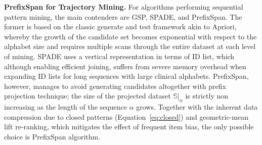 \textbf{PrefixSpan for Trajectory Mining.} For algorithms performing sequential pattern mining, the main contenders are GSP, SPADE, and PrefixSpan. The former is based on the classic generate and test framework akin to Apriori, whereby the growth of the candidate set becomes exponential with respect to the alphabet size and requires multiple scans through the entire dataset at each level of mining. SPADE uses a vertical representation in terms of ID list, which although enabling efficient joining, suffers from severe memory overhead when expanding ID lists for long sequences with large clinical alphabets. PrefixSpan, however, manages to avoid generating candidates altogether with prefix projection technique; the size of the projected dataset $\mathbb{S}|_\alpha$ is strictly non increasing as the length of the sequence $\alpha$ grows. Together with the inherent data compression due to closed patterns (Equation~\eqref{eq:closed}) and geometric-mean lift re-ranking, which mitigates the effect of frequent item bias, the only possible choice is PrefixSpan algorithm.